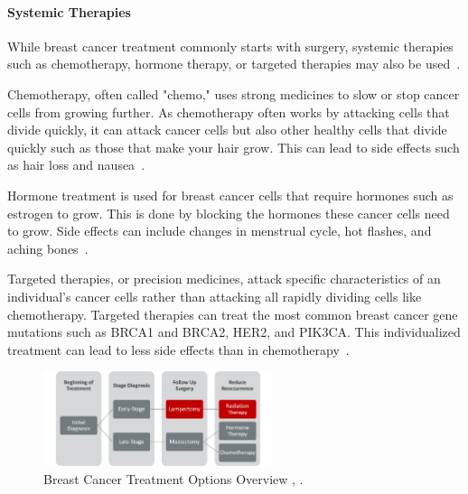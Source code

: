 \paragraph*{Systemic Therapies\label{sec:introduction:breastcancer:currenttreatmentoptions:systemictherapies}}
While breast cancer treatment commonly starts with surgery, systemic therapies such as chemotherapy, hormone therapy, or targeted therapies may also be used~\cite{RefWorks:RefID:37-memorialsurgery}.

Chemotherapy, often called "chemo," uses strong medicines to slow or stop cancer cells from growing further. As chemotherapy often works by attacking cells that divide quickly, it can attack cancer cells but also other healthy cells that divide quickly such as those that make your hair grow. This can lead to side effects such as hair loss and nausea~\cite{RefWorks:RefID:37-memorialsurgery}.

Hormone treatment is used for breast cancer cells that require hormones such as estrogen to grow. This is done by blocking the hormones these cancer cells need to grow. Side effects can include changes in menstrual cycle, hot flashes, and aching bones~\cite{RefWorks:RefID:37-memorialsurgery}.

Targeted therapies, or precision medicines, attack specific characteristics of an individual's cancer cells rather than attacking all rapidly dividing cells like chemotherapy. Targeted therapies can treat the most common breast cancer gene mutations such as BRCA1 and BRCA2, HER2, and PIK3CA. This individualized treatment can lead to less side effects than in chemotherapy~\cite{RefWorks:RefID:37-memorialsurgery}.

\begin{figure}[h!]
        \centering
        \includegraphics[width=0.6\textwidth]{../figs/introduction/breast_cancer_treatment_process_flowchart.png}
        \caption{Breast Cancer Treatment Options Overview \cite{RefWorks:RefID:37-memorialsurgery}, \cite{RefWorks:RefID:370-einsteinisaac}.}
        \label{fig:introduction:breast_cancer_treatment_options_overview}
\end{figure}

